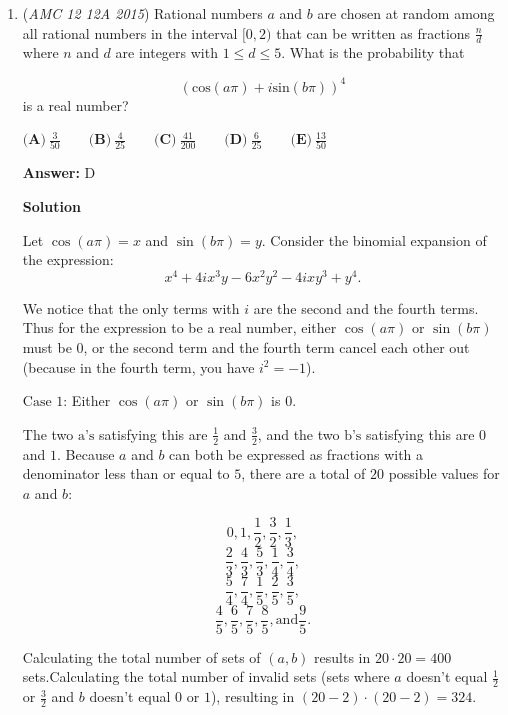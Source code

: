\begin{enumerate}
 \href{https://artofproblemsolving.com/videos/amc/2015amc12a/399}{https://artofproblemsolving.com/videos/amc/2015amc12a/399}

 


	\item (\textit{AMC 12 12A 2015}) Rational numbers $a$ and $b$ are chosen at random among all rational numbers in the interval $[0,2)$ that can be written as fractions $\frac{n}{d}$ where $n$ and $d$ are integers with $1 \le d \le 5$. What is the probability that

 \[(\text{cos}(a\pi)+i\text{sin}(b\pi))^4\]
is a real number?


 $\textbf{(A)}\ \frac{3}{50} \qquad\textbf{(B)}\ \frac{4}{25} \qquad\textbf{(C)}\ \frac{41}{200} \qquad\textbf{(D)}\ \frac{6}{25} \qquad\textbf{(E)}\ \frac{13}{50}$

 \textbf{Answer: }D



\textbf{Solution}

Let $\cos(a\pi) = x$ and $\sin(b\pi) = y$. Consider the binomial expansion of the expression:
 \[x^4 + 4ix^{3}y - 6x^{2}y^{2} - 4ixy^3 + y^4.\]

 We notice that the only terms with $i$ are the second and the fourth terms. Thus for the expression to be a real number, either $\cos(a\pi)$ or $\sin(b\pi)$ must be $0$, or the second term and the fourth term cancel each other out (because in the fourth term, you have $i^2 = -1$). 

 $\text{Case~1:}$ Either $\cos(a\pi)$ or $\sin(b\pi)$ is $0$. 

 The two $\text{a's}$ satisfying this are $\frac{1}{2}$ and $\frac{3}{2}$, and the two $\text{b's}$ satisfying this are $0$ and $1$. Because $a$ and $b$ can both be expressed as fractions with a denominator less than or equal to $5$, there are a total of $20$ possible values for $a$ and $b$:

 
 \[0, 1, \frac{1}{2}, \frac{3}{2}, \frac{1}{3},\] 
 \[\frac{2}{3}, \frac{4}{3}, \frac{5}{3}, \frac{1}{4}, \frac{3}{4},\] 
 \[\frac{5}{4}, \frac{7}{4}, \frac{1}{5}, \frac{2}{5}, \frac{3}{5},\] 
 \[\frac{4}{5}, \frac{6}{5}, \frac{7}{5}, \frac{8}{5}, \text{and} \frac{9}{5}.\]

 Calculating the total number of sets of $(a,b)$ results in $20 \cdot 20 = 400$ sets.Calculating the total number of invalid sets (sets where $a$ doesn't equal $\frac{1}{2}$ or $\frac{3}{2}$ and $b$ doesn't equal $0$ or $1$), resulting in $(20-2) \cdot (20-2) = 324$.


\end{enumerate}
